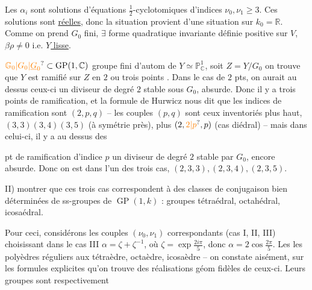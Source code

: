 Les $\alpha_i$ sont solutions d'équations $\tfrac12$-cyclotomiques d'indices $\nu_0,\nu_1\geq3$. Ces solutions sont \uline{réelles}, donc la situation provient d'une situation sur $k_0=\mathbb R$. Comme on prend $G_0$  fini, $\exists$ forme quadratique invariante définie positive sur $V$,  $\boxed{\beta\rho\ne0}$ i.e. \uline{$Y$ lisse}.

$\unsure{\mathbb G_0|G_0|\underline G_0}\subset\operatorname{GP}(1,\mathbb C)$ groupe fini d'autom de $Y\simeq\mathbb P^1_{\mathbb C}$,  soit $Z=Y/G_0$    on trouve que $Y$ est ramifié sur $Z$ en $2$ ou trois points . Dans le cas de $2$ pts, on aurait au dessus  ceux-ci un diviseur de degré $2$ stable sous $G_0$, absurde. Donc il y a trois points de ramification, et la formule de Hurwicz nous dit que les  indices de ramification sont $(2,p,q)$ -- les couples $(p,q)$ sont  ceux inventoriés plus haut,  $(3,3)(3,4)(3,5)$  (à  symétrie près), plus $(2,\unsure{2|p},p)$ (cas diédral) -- mais dans celui-ci, il y a au dessus des

pt de ramification d'indice $p$ un diviseur de degré $2$ stable par $G_0$, encore absurde. Donc on est dans l'un des trois cas, $(2,3,3),(2,3,4),(2,3,5)$.

II)  montrer que ces trois cas  correspondent à des classes de conjugaison bien déterminées de ss-groupes de $\operatorname{GP}(1,k)$ : groupes tétraédral, octahédral, icosaédral.

Pour ceci, considérons les couples $(\nu_0,\nu_1)$ correspondants (cas I, II, III)  choisissant dans le cas III $\alpha=\zeta+\zeta^{-1}$, où $\zeta=\exp\frac{2i\pi}{5}$, donc $\alpha=2\cos\frac{2\pi}{5}$. Les  les polyèdres réguliers   aux tétraèdre, octaèdre, icosaèdre -- on constate aisément, sur les formules explicites qu'on trouve des réalisations géom  fidèles de ceux-ci. Leurs groupes  sont respectivement

